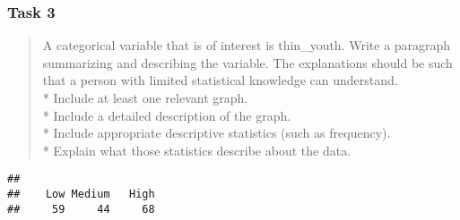 \documentclass[
]{article}
\newenvironment{Shaded}{\begin{snugshade}}{\end{snugshade}}
\newcommand{\AttributeTok}[1]{\textcolor[rgb]{0.77,0.63,0.00}{#1}}
\newcommand{\DecValTok}[1]{\textcolor[rgb]{0.00,0.00,0.81}{#1}}
\newcommand{\FunctionTok}[1]{\textcolor[rgb]{0.00,0.00,0.00}{#1}}
\newcommand{\NormalTok}[1]{#1}
\newcommand{\OtherTok}[1]{\textcolor[rgb]{0.56,0.35,0.01}{#1}}
\newcommand{\SpecialCharTok}[1]{\textcolor[rgb]{0.00,0.00,0.00}{#1}}
\newcommand{\StringTok}[1]{\textcolor[rgb]{0.31,0.60,0.02}{#1}}
\begin{document}
\hypertarget{task-3}{%
\subsubsection{Task 3}\label{task-3}}

\begin{quote}
A categorical variable that is of interest is thin\_youth. Write a
paragraph summarizing and describing the variable. The explanations
should be such that a person with limited statistical knowledge can
understand.\\
* Include at least one relevant graph.\\
* Include a detailed description of the graph.\\
* Include appropriate descriptive statistics (such as frequency).\\
* Explain what those statistics describe about the data.
\end{quote}

\begin{Shaded}
\end{Shaded}

\begin{verbatim}
## 
##    Low Medium   High 
##     59     44     68
\end{verbatim}

\begin{Shaded}
\end{Shaded}
\end{document}
